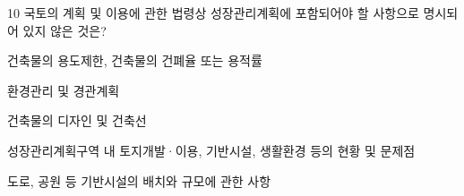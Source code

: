 \begin{question}{10}
국토의 계획 및 이용에 관한 법령상 성장관리계획에 포함되어야 할 사항으로 명시되어 있지 않은 것은?
\begin{choices}
  \item 건축물의 용도제한, 건축물의 건폐율 또는 용적률
  \item 환경관리 및 경관계획
  \item 건축물의 디자인 및 건축선
  \item 성장관리계획구역 내 토지개발·이용, 기반시설, 생활환경 등의 현황 및 문제점
  \item 도로, 공원 등 기반시설의 배치와 규모에 관한 사항
\end{choices}
\end{question}
